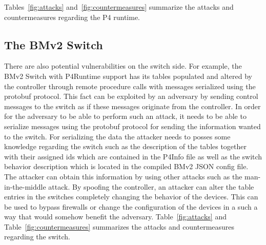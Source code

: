 \documentclass[10pt,sigconf]{acmart}
\begin{document}
Tables~\ref{fig:attacks} and~\ref{fig:countermeasures} summarize the 
attacks and countermeasures regarding the 
P4 runtime.

\subsection{The BMv2 Switch}

There are also potential vulnerabilities on the
switch side. 
For example, the BMv2 Switch with P4Runtime support has 
its tables populated and altered
by the controller through remote procedure calls 
with messages serialized using the
protobuf protocol. This fact can be exploited by an adversary 
by sending control messages to the switch as if these messages 
originate from the controller.
In order for the adversary to be able to perform such 
an attack, it needs to be able to serialize messages 
using the protobuf protocol for sending the
information wanted to the switch. For serializing the data 
the attacker needs to
posses some knowledge regarding the switch such as the description 
of the tables
together with their assigned ids which are contained in the P4Info file as well as the
switch behavior description which is located in the compiled 
BMv2 JSON config
file. 
%
The attacker can obtain this information by 
using other attacks such as the
man-in-the-middle attack.
By spoofing the controller, an attacker can alter 
the table entries in the switches
completely changing the behavior of the devices. 
This can be used to bypass firewalls
or change the configuration of the devices in a such a way that would somehow
benefit the adversary.
Table~\ref{fig:attacks} and Table~\ref{fig:countermeasures} summarizes the 
attacks and countermeasures regarding the switch.
\end{document}
